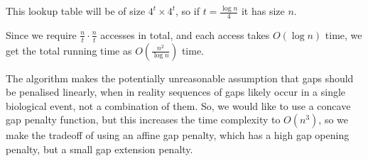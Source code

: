 This lookup table will be of size $4^t \times 4^t$, so if $t = \frac{\log n}{4}$ it has size $n$.

Since we require $\frac{n}{t} \cdot \frac{n}{t}$ accesses in total, and each access takes $O(\log n)$ time, we get the total running time as $O(\frac{n^2}{\log n})$ time.

The algorithm makes the potentially unreasonable assumption that gaps should be penalised linearly, when in reality sequences of gaps likely occur in a single biological event, not a combination of them. So, we would like to use a concave gap penalty function, but this increases the time complexity to $O(n^3)$, so we make the tradeoff of using an affine gap penalty, which has a high gap opening penalty, but a small gap extension penalty.







